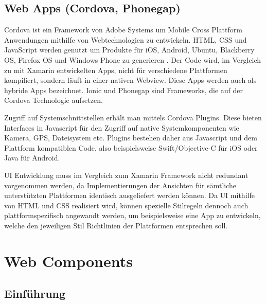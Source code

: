 \newpage


\subsection{Web Apps (Cordova, Phonegap)}

Cordova ist ein Framework von Adobe Systems um Mobile Cross Plattform Anwendungen mithilfe von Webtechnologien zu entwickeln.
\ac{HTML}, \ac{CSS} und JavaScript werden genutzt um Produkte für iOS, Android, Ubuntu, Blackberry OS, Firefox OS und Windows Phone zu generieren \cite{Cordo26:online}.
Der Code wird, im Vergleich zu mit Xamarin entwickelten Apps, nicht für verschiedene Plattformen kompiliert,
sondern läuft in einer nativen Webview. Diese Apps werden auch als hybride Apps bezeichnet.
Ionic und Phonegap sind Frameworks, die auf der Cordova Technologie aufsetzen.

Zugriff auf Systemschnittstellen erhält man mittels Cordova Plugins. Diese bieten
Interfaces in Javascript für den Zugriff auf native Systemkomponenten wie Kamera, GPS, Dateisystem etc.
Plugins bestehen daher aus Javascript und dem Plattform kompatiblen Code,
also beispielsweise Swift/Objective-C für iOS oder Java für Android.

\ac{UI} Entwicklung muss im Vergleich zum Xamarin Framework nicht redundant vorgenommen werden, da Implementierungen der
Ansichten für sämtliche unterstützten Plattformen identisch ausgeliefert werden können.
Da \ac{UI} mithilfe von \ac{HTML} und \ac{CSS} realisiert wird,
können spezielle Stilregeln dennoch auch plattformspezifisch angewandt werden, um beispielsweise eine App zu entwickeln,
welche den jeweiligen Stil Richtlinien der Plattformen entsprechen soll.

\vspace{0.3cm}

\vspace{0.3cm}

\newpage
\section{Web Components}


\subsection{Einführung}


